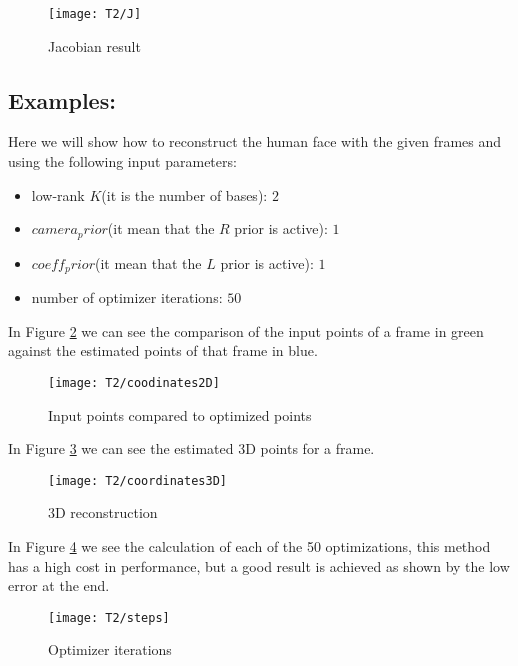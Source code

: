 \begin{figure}[h]
    \centering
    \texttt{[image: T2/J]}
    \caption{Jacobian result}
    \label{fig:J}
\end{figure}

\subsection{Examples:}
\noindent Here we will show how to reconstruct the human face with the given frames and using the following input parameters:

\begin{itemize}
\item low-rank $K$(it is the number of bases): $2$
\item $camera_prior$(it mean that the $R$ prior is active): $1$
\item $coeff_prior$(it mean that the $L$ prior is active): $1$
\item number of optimizer iterations: $50$
\end{itemize}
\noindent In Figure \ref{fig:coodinates2D} we can see the comparison of the input points of a frame in green against the estimated points of that frame in blue.\\

\begin{figure}[h]
    \centering
    \texttt{[image: T2/coodinates2D]}
    \caption{Input points compared to optimized points}
    \label{fig:coodinates2D}
\end{figure}

\noindent In Figure \ref{fig:coordinates3D} we can see the estimated 3D points for a frame.\\
\begin{figure}[h]
    \centering
    \texttt{[image: T2/coordinates3D]}
    \caption{3D reconstruction}
    \label{fig:coordinates3D}
\end{figure}
\noindent In Figure \ref{fig:steps} we see the calculation of each of the 50 optimizations, this method has a high cost in performance, but a good result is achieved as shown by the low error at the end.\\
\begin{figure}[h]
    \centering
    \texttt{[image: T2/steps]}
    \caption{Optimizer iterations}
    \label{fig:steps}
\end{figure}
